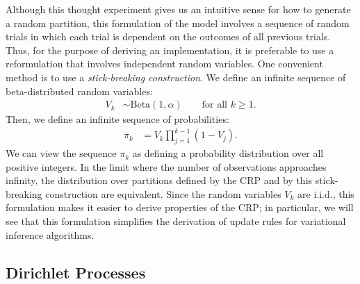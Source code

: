 \documentclass{article}
\begin{document}
Although this thought experiment gives us an intuitive sense for how to generate a random partition, this formulation of the model involves a sequence of random trials in which each trial is dependent on the outcomes of all previous trials.
Thus, for the purpose of deriving an implementation, it is preferable to use a reformulation that involves independent random variables.
One convenient method is to use a \emph{stick-breaking construction}.
We define an infinite sequence of beta-distributed random variables:
\begin{align}
V_k &\sim \text{Beta}(1, \alpha) \qquad \text{for all $k \geq 1$}.
\end{align}
Then, we define an infinite sequence of probabilities:
\begin{align}
\pi_k &= V_k \prod_{j=1}^{k-1} (1-V_j).
\label{eq:pi_crp}
\end{align}
We can view the sequence $\pi_k$ as defining a probability distribution over all positive integers.
In the limit where the number of observations approaches infinity, the distribution over partitions defined by the CRP and by this stick-breaking construction are equivalent.
Since the random variables $V_k$ are i.i.d., this formulation makes it easier to derive properties of the CRP; in particular, we will see that this formulation simplifies the derivation of update rules for variational inference algorithms.

\subsection{Dirichlet Processes}
\end{document}
